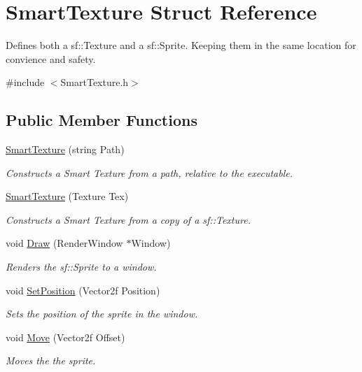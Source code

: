 \hypertarget{struct_smart_texture}{}\section{Smart\+Texture Struct Reference}
\label{struct_smart_texture}


Defines both a sf\+::\+Texture and a sf\+::\+Sprite. Keeping them in the same location for convience and safety.  




{\ttfamily \#include $<$Smart\+Texture.\+h$>$}

\subsection*{Public Member Functions}
\begin{DoxyCompactItemize}
\item 
\hyperlink{struct_smart_texture_a1709abdbcbba9136de0acce7a243a88e}{Smart\+Texture} (string Path)
\begin{DoxyCompactList}\small\item\em Constructs a Smart Texture from a path, relative to the executable. \end{DoxyCompactList}\item 
\hyperlink{struct_smart_texture_a46ac388243d615cbd00feac8fcb0f7fc}{Smart\+Texture} (Texture Tex)
\begin{DoxyCompactList}\small\item\em Constructs a Smart Texture from a copy of a sf\+::\+Texture. \end{DoxyCompactList}\item 
void \hyperlink{struct_smart_texture_ae8e39d3a1b4b325c1da2d300ba623e17}{Draw} (Render\+Window $\ast$Window)
\begin{DoxyCompactList}\small\item\em Renders the sf\+::\+Sprite to a window. \end{DoxyCompactList}\item 
void \hyperlink{struct_smart_texture_a2e8af63d05559a8e7d2c7b6b3c6f207e}{Set\+Position} (Vector2f Position)
\begin{DoxyCompactList}\small\item\em Sets the position of the sprite in the window. \end{DoxyCompactList}\item 
void \hyperlink{struct_smart_texture_a26caafb4d4e040df68143747758569c0}{Move} (Vector2f Offset)
\begin{DoxyCompactList}\small\item\em Moves the the sprite. \end{DoxyCompactList}\item 

\end{DoxyCompactItemize}
